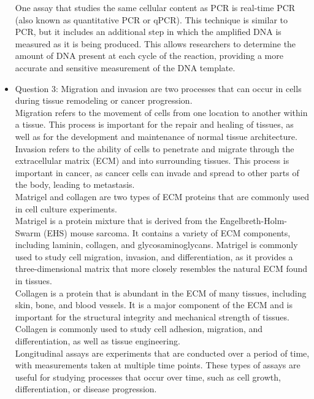 \documentclass{article}
\begin{document}
\begin{itemize}
One assay that studies the same cellular content as PCR is real-time PCR (also known as quantitative PCR or qPCR). This technique is similar to PCR, but it includes an additional step in which the amplified DNA is measured as it is being produced. This allows researchers to determine the amount of DNA present at each cycle of the reaction, providing a more accurate and sensitive measurement of the DNA template.
    \item Question 3:
Migration and invasion are two processes that can occur in cells during tissue remodeling or cancer progression.\\

Migration refers to the movement of cells from one location to another within a tissue. This process is important for the repair and healing of tissues, as well as for the development and maintenance of normal tissue architecture.\\

Invasion refers to the ability of cells to penetrate and migrate through the extracellular matrix (ECM) and into surrounding tissues. This process is important in cancer, as cancer cells can invade and spread to other parts of the body, leading to metastasis.\\

Matrigel and collagen are two types of ECM proteins that are commonly used in cell culture experiments.\\

Matrigel is a protein mixture that is derived from the Engelbreth-Holm-Swarm (EHS) mouse sarcoma. It contains a variety of ECM components, including laminin, collagen, and glycosaminoglycans. Matrigel is commonly used to study cell migration, invasion, and differentiation, as it provides a three-dimensional matrix that more closely resembles the natural ECM found in tissues.\\

Collagen is a protein that is abundant in the ECM of many tissues, including skin, bone, and blood vessels. It is a major component of the ECM and is important for the structural integrity and mechanical strength of tissues. Collagen is commonly used to study cell adhesion, migration, and differentiation, as well as tissue engineering.\\

Longitudinal assays are experiments that are conducted over a period of time, with measurements taken at multiple time points. These types of assays are useful for studying processes that occur over time, such as cell growth, differentiation, or disease progression.\\


\end{itemize}
\end{document}
